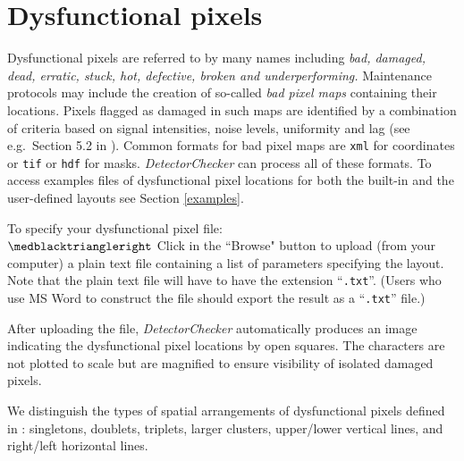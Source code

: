 \documentclass[11pt,a4paper]{article}
\newcommand{\DetectorChecker}{\emph{DetectorChecker}\xspace}
\begin{document}
\section{Dysfunctional pixels}\label{dysfct}

Dysfunctional pixels are referred to by many names including \emph{bad, damaged, dead, erratic, stuck, hot, defective, broken and underperforming.} Maintenance protocols may include the creation of so-called \emph{bad pixel maps} containing their locations. Pixels flagged as damaged in such maps are identified by a combination of criteria based on signal intensities, noise levels, uniformity and lag (see e.g.~Section 5.2 in \cite{manualXRD1621}). 
Common formats for bad pixel maps are \texttt{xml} for coordinates or \texttt{tif} or \texttt{hdf} for masks. 
\DetectorChecker can process all of these formats. To access examples files of dysfunctional pixel locations for both the built-in and the user-defined layouts see Section \ref{examples}.

To specify your dysfunctional pixel file:
\\
$\medblacktriangleright$ Click in the ``Browse" button 
to upload (from your computer) a plain text file containing a list of parameters specifying the layout. Note that the plain text file will have to have the extension ``\texttt{.txt}''. (Users who use MS Word to construct the file should export the result as a ``\texttt{.txt}'' file.) 

After uploading the file, \DetectorChecker automatically produces an image indicating the dysfunctional pixel locations 
by open squares. The characters are not plotted to scale but are magnified to ensure visibility of isolated damaged pixels.

We distinguish the types of spatial arrangements of dysfunctional pixels defined in \cite{brettschneider2014crism}:
singletons, doublets, triplets, larger clusters, upper/lower vertical lines, and right/left horizontal lines.
\end{document}
